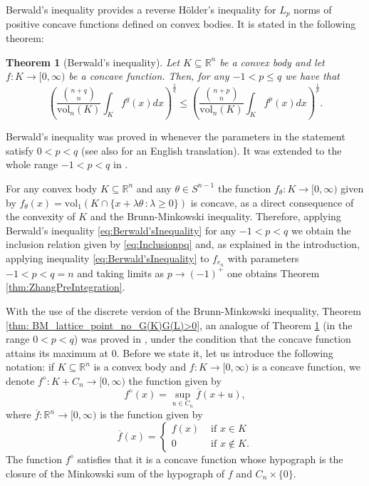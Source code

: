 \documentclass[10pt]{amsart}
\newtheorem{thm}{Theorem}[section]
\def\R{\mathbb{R}}
\def\vol{\mathrm{vol}}
\numberwithin{equation}{section}
\begin{document}
Berwald's inequality  provides a reverse H\"older's inequality for $L_p$ norms of positive concave functions defined on convex bodies. It is stated in the following theorem:

\begin{thm}[Berwald's inequality]\label{thm:Berwald}
Let $K\subseteq\R^n$ be a convex body and let $f:K\to[0,\infty)$ be a concave function. Then, for any $-1<p\leq q$ we have that
\begin{equation}\label{eq:Berwald'sInequality}
\left(\frac{{{n+q}\choose{n}}}{\vol_n(K)}\int_K f^q(x)dx\right)^\frac{1}{q}\leq\left(\frac{{{n+p}\choose{n}}}{\vol_n(K)}\int_K f^p(x)dx\right)^\frac{1}{p}.
\end{equation}
\end{thm}

Berwald's inequality was proved in \cite[Satz 7]{Be} whenever the parameters in the statement satisfy $0<p<q$ (see also \cite[Theorem 7.2]{AAGJV} for an English translation). It was extended to the whole range $-1<p<q$ in \cite[Theorem 5.1]{GZ}.


For any convex body $K\subseteq\R^n$ and any $\theta\in S^{n-1}$ the function $f_\theta:K\to[0,\infty)$ given by $f_\theta(x)=\vol_1(K\cap\{x+\lambda \theta\,:\lambda\geq0\})$ is concave, as a direct consequence of the convexity of $K$ and the Brunn-Minkowski inequality. Therefore, applying Berwald's inequality \eqref{eq:Berwald'sInequality} for any $-1<p<q$ we obtain the inclusion relation given by \eqref{eq:Inclusionpq} and, as explained in the introduction,
applying inequality \eqref{eq:Berwald'sInequality} to $f_{e_n}$ with parameters $-1<p<q=n$ and taking limits as $p\to(-1)^+$ one obtains Theorem \ref{thm:ZhangPreIntegration}.


With the use of the discrete version of the Brunn-Minkowski inequality, Theorem \ref{thm: BM_lattice_point_no_G(K)G(L)>0}, an analogue of Theorem \ref{thm:Berwald} (in the range $0<p<q$) was proved in \cite[Theorem 1.4]{ALY}, under the condition that the concave function attains its maximum at 0. Before we state it, let us introduce the following notation: if $K\subseteq\R^n$ is a convex body and $f:K\to[0,\infty)$ is a concave function, we denote $f^\diamond:K+C_n\to[0,\infty)$ the function given by
\begin{equation}\label{eq:DefinitionDiamond}
f^\diamond(x)=\sup_{u\in C_n}\overline{f}(x+u),
\end{equation}
where $\overline{f}:\R^n\to[0,\infty)$ is the function given by
$$
\overline{f}(x)=\begin{cases}
f(x) &\textrm{ if }x\in K\\
0 &\textrm{ if }x\not\in K.
\end{cases}
$$
The function $f^\diamond$ satisfies that it is a concave function whose hypograph is the closure of the Minkowski sum of the hypograph of $f$ and $C_n\times\{0\}$.
\end{document}

